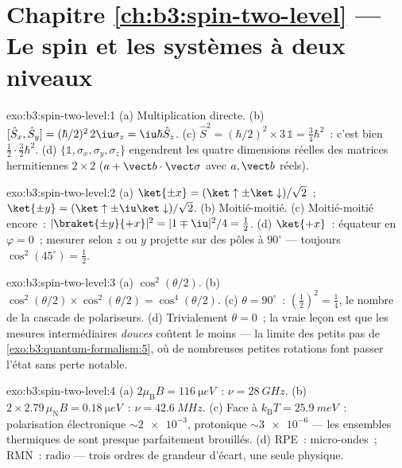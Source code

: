 \section*{Chapitre \ref{ch:b3:spin-two-level} --- Le spin et les systèmes à deux niveaux}

\begin{solution}{exo:b3:spin-two-level:1}
(a) Multiplication directe. (b) $[\hat S_x, \hat S_y] =
(\hbar/2)^2\,2\iu\sigma_z = \iu\hbar\hat S_z$. (c) $\hat S^2 =
(\hbar/2)^2 \times 3\,\mathbb 1 = \tfrac34\hbar^2$~: c'est bien
$\tfrac12\cdot\tfrac32\hbar^2$. (d) $\{\mathbb 1, \sigma_x,
\sigma_y, \sigma_z\}$ engendrent les quatre dimensions réelles des
matrices hermitiennes $2\times2$ ($a + \vect b\cdot\vect\sigma$ avec $a,
\vect b$ réels).
\end{solution}

\begin{solution}{exo:b3:spin-two-level:2}
(a) $\ket{\pm x} = (\ket\uparrow \pm \ket\downarrow)/\sqrt2$~;
$\ket{\pm y} = (\ket\uparrow \pm \iu\ket\downarrow)/\sqrt2$. (b)
Moitié-moitié. (c) Moitié-moitié encore~: $|\braket{\pm y}{+x}|^2 =
|1 \mp \iu|^2/4 = \tfrac12$. (d) $\ket{+x}$~: équateur en $\varphi =
0$~; mesurer selon $z$ ou $y$ projette sur des pôles à $90^\circ$
--- toujours $\cos^2(45^\circ) = \tfrac12$.
\end{solution}

\begin{solution}{exo:b3:spin-two-level:3}
(a) $\cos^2(\theta/2)$. (b) $\cos^2(\theta/2) \times
\cos^2(\theta/2) = \cos^4(\theta/2)$. (c) $\theta = 90^\circ$~:
$(\tfrac12)^2 = \tfrac14$, le nombre de la cascade de polariseurs. (d)
Trivialement $\theta = 0$~; la vraie leçon est que les mesures
intermédiaires \emph{douces} coûtent le moins --- la limite des petits
pas de \cref{exo:b3:quantum-formalism:5}, où de nombreuses petites
rotations font passer l'état sans perte notable.
\end{solution}

\begin{solution}{exo:b3:spin-two-level:4}
(a) $2\mu_{\text{B}}B = \qty{116}{\micro eV}$~: $\nu =
\qty{28}{GHz}$. (b) $2 \times 2.79\,\mu_{\text{N}}B =
\qty{0.18}{\micro eV}$~: $\nu = \qty{42.6}{MHz}$. (c) Face à
$k_{\text{B}}T = \qty{25.9}{meV}$~: polarisation électronique
$\sim\num{2e-3}$, protonique $\sim\num{3e-6}$ --- les ensembles
thermiques de  sont presque parfaitement brouillés. (d) RPE~:
micro-ondes~; RMN~: radio --- trois ordres de grandeur d'écart, une
seule physique.
\end{solution}

